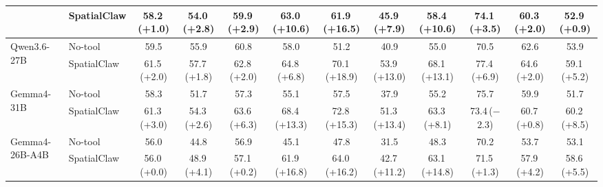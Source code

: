 \documentclass{llmxive}
\providecommand{\ours}{SpatialClaw}
\providecommand{\up}[1]{\,{\scriptsize(+#1)}}
\providecommand{\dn}[1]{\,{\scriptsize($-$#1)}}
\providecommand{\eq}[1]{\,{\scriptsize(+#1)}}
\begin{document}
\begin{table}[t]
{{\begin{tabular}{ll cccc ccc ccc}
  & \ours{}  & 58.2\up{1.0} & 54.0\up{2.8} & 59.9\up{2.9} & 63.0\up{10.6} & 61.9\up{16.5} & 45.9\up{7.9} & 58.4\up{10.6} & 74.1\up{3.5} & 60.3\up{2.0} & 52.9\up{0.9} \\
\midrule
\multirow{2}{*}{Qwen3.6-27B~\citep{qwen3.6-27b}}
& No-tool & 59.5 & 55.9 & 60.8 & 58.0 & 51.2 & 40.9 & 55.0 & 70.5 & 62.6 & 53.9 \\
& \ours{}  & 61.5\up{2.0} & 57.7\up{1.8} & 62.8\up{2.0} & 64.8\up{6.8} & 70.1\up{18.9} & 53.9\up{13.0} & 68.1\up{13.1} & 77.4\up{6.9} & 64.6\up{2.0} & 59.1\up{5.2} \\
\midrule
\multirow{2}{*}{Gemma4-31B~\citep{gemma4}}
  & No-tool & 58.3 & 51.7 & 57.3 & 55.1 & 57.5 & 37.9 & 55.2 & 75.7 & 59.9 & 51.7 \\
  & \ours{}  & 61.3\up{3.0} & 54.3\up{2.6} & 63.6\up{6.3} & 68.4\up{13.3} & 72.8\up{15.3} & 51.3\up{13.4} & 63.3\up{8.1} & 73.4\dn{2.3} & 60.7\up{0.8} & 60.2\up{8.5} \\
\midrule
\multirow{2}{*}{Gemma4-26B-A4B~\citep{gemma4}}
  & No-tool & 56.0 & 44.8 & 56.9 & 45.1 & 47.8 & 31.5 & 48.3 & 70.2 & 53.7 & 53.1 \\
  & \ours{}  & 56.0\eq{0.0} & 48.9\up{4.1} & 57.1\up{0.2} & 61.9\up{16.8} & 64.0\up{16.2} & 42.7\up{11.2} & 63.1\up{14.8} & 71.5\up{1.3} & 57.9\up{4.2} & 58.6\up{5.5} \\
\bottomrule
\end{tabular}%
}}


\end{table}
\end{document}
